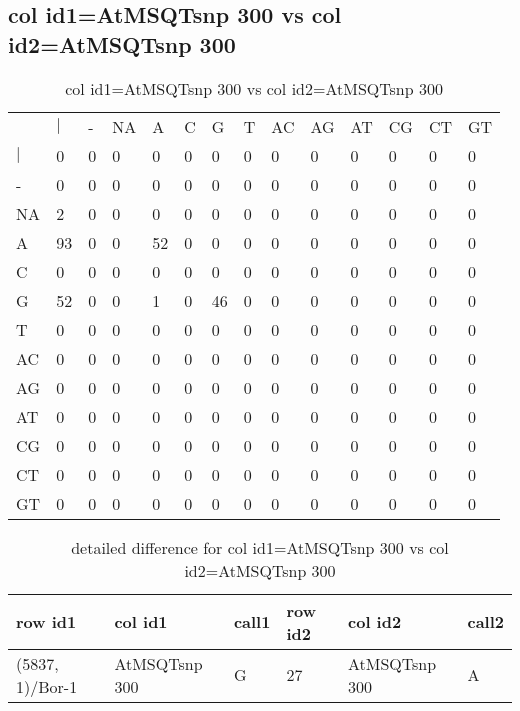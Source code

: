 \subsection{col id1=AtMSQTsnp 300 vs col id2=AtMSQTsnp 300}
\begin{center}
\begin{longtable}{|l|l|l|l|l|l|l|l|l|l|l|l|l|l|}
\caption{col id1=AtMSQTsnp 300 vs col id2=AtMSQTsnp 300} \label{table_dm646}\\
\hline
\\
\hline
&$|$&-&NA&A&C&G&T&AC&AG&AT&CG&CT&GT\\
$|$&0&0&0&0&0&0&0&0&0&0&0&0&0\\
-&0&0&0&0&0&0&0&0&0&0&0&0&0\\
NA&2&0&0&0&0&0&0&0&0&0&0&0&0\\
A&93&0&0&52&0&0&0&0&0&0&0&0&0\\
C&0&0&0&0&0&0&0&0&0&0&0&0&0\\
G&52&0&0&1&0&46&0&0&0&0&0&0&0\\
T&0&0&0&0&0&0&0&0&0&0&0&0&0\\
AC&0&0&0&0&0&0&0&0&0&0&0&0&0\\
AG&0&0&0&0&0&0&0&0&0&0&0&0&0\\
AT&0&0&0&0&0&0&0&0&0&0&0&0&0\\
CG&0&0&0&0&0&0&0&0&0&0&0&0&0\\
CT&0&0&0&0&0&0&0&0&0&0&0&0&0\\
GT&0&0&0&0&0&0&0&0&0&0&0&0&0\\
\hline
\end{longtable}
\end{center}

\begin{center}
\begin{longtable}{|l|l|l|l|l|l|}
\caption{detailed difference for col id1=AtMSQTsnp 300 vs col id2=AtMSQTsnp 300} \label{table_dm647}\\
\hline
row id1&col id1&call1&row id2&col id2&call2\\
\hline
(5837, 1)/Bor-1&AtMSQTsnp 300&G&27&AtMSQTsnp 300&A\\
\hline
\end{longtable}
\end{center}

